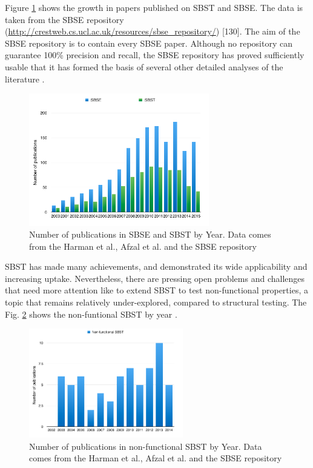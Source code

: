 \documentclass{report}
\begin{document}
Figure \ref{fig:sbsesbst}  shows the growth in papers published on SBST and SBSE. The data is taken from the SBSE repository (\url{http://crestweb.cs.ucl.ac.uk/resources/sbse_repository/}) [130]. 
The aim of the SBSE repository is to contain every SBSE paper. Although no repository can guarantee 100\% precision and recall, the SBSE repository has proved sufficiently usable that it has formed the basis of several other detailed analyses of the literature \cite{Harman2015}. 


\begin{figure}[h]
\centering
\includegraphics[width=0.7\textwidth]{./images/publications1.png}
\caption{Number of publications in SBSE and SBST by Year. Data comes from the Harman et al., Afzal et al. and the SBSE repository  \cite{Afzal2009a} \cite{Harman2015}}
\label{fig:sbsesbst}
\end{figure}


SBST has made many achievements, and demonstrated its wide applicability and increasing uptake. Nevertheless, there are pressing open problems and challenges that need more attention like to extend SBST to test non-functional properties, a topic that remains relatively under-explored, compared to structural testing. The Fig. \ref{fig:nonfunctional} shows the non-funtional SBST by year \cite{Aleti2016} \cite{Harman2015}. 

\begin{figure}[h]
\centering
\includegraphics[width=0.6\textwidth]{./images/nonfunctional.png}
\caption{Number of publications in non-functional SBST by Year. Data comes from the Harman et al., Afzal et al. and the SBSE repository  \cite{Afzal2009a} \cite{Harman2015} }
\label{fig:nonfunctional}
\end{figure}
\end{document}
